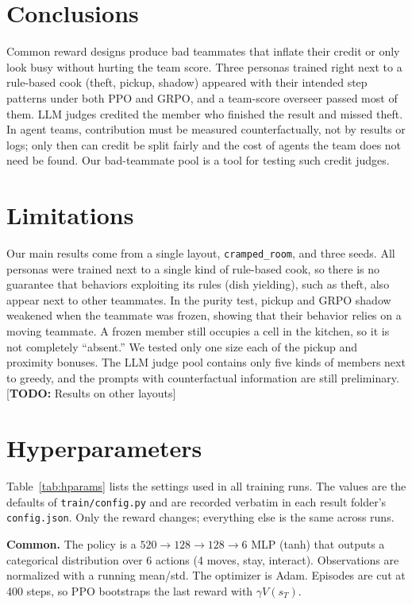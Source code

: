 \documentclass[letterpaper]{article} %
\newcommand{\TODO}[1]{[\textbf{TODO:} #1]}
\begin{document}
\section{Conclusions}
Common reward designs produce bad teammates that inflate their credit or only look busy without hurting
the team score. Three personas trained right next to a rule-based cook (theft, pickup, shadow) appeared
with their intended step patterns under both PPO and GRPO, and a team-score overseer passed most of them.
LLM judges credited the member who finished the result and missed theft. In agent teams, contribution
must be measured counterfactually, not by results or logs; only then can credit be split fairly and the
cost of agents the team does not need be found. Our bad-teammate pool is a tool for testing such credit
judges.

\section{Limitations}
Our main results come from a single layout, \texttt{cramped\_room}, and three seeds. All personas were
trained next to a single kind of rule-based cook, so there is no guarantee that behaviors exploiting its
rules (dish yielding), such as theft, also appear next to other teammates. In the purity test, pickup and
GRPO shadow weakened when the teammate was frozen, showing that their behavior relies on a moving
teammate. A frozen member still occupies a cell in the kitchen, so it is not completely ``absent.'' We
tested only one size each of the pickup and proximity bonuses. The LLM judge pool contains only five
kinds of members next to greedy, and the prompts with counterfactual information are still preliminary.
\TODO{Results on other layouts}



\appendix
\section{Hyperparameters}
Table~\ref{tab:hparams} lists the settings used in all training runs. The values are the defaults of
\texttt{train/config.py} and are recorded verbatim in each result folder's \texttt{config.json}. Only
the reward changes; everything else is the same across runs.

\textbf{Common.} The policy is a $520 \rightarrow 128 \rightarrow 128 \rightarrow 6$ MLP (tanh) that
outputs a categorical distribution over 6 actions (4 moves, stay, interact). Observations are normalized
with a running mean/std. The optimizer is Adam. Episodes are cut at 400 steps, so PPO bootstraps the
last reward with $\gamma V(s_T)$.
\end{document}
